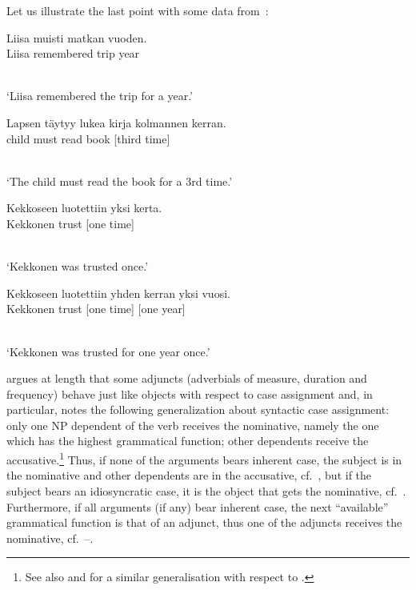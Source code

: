 \documentclass[output=paper]{langsci/langscibook}
\begin{document}
Let us illustrate the last point with some  data from~\citealt{mali:93}:
\begin{examples}
\item \label{subj}
  \begin{gloss}
    Liisa muisti matkan vuoden. \\
    Liisa\Nom{} remembered trip\Acc{} year\Acc{}
  \end{gloss}\\[\glosslen]
  `Liisa remembered the trip for a year.'
\item \label{adv1bis} \label{obj}
  \begin{gloss}
    Lapsen t\"aytyy lukea kirja \phtm{[}kolmannen kerran. \\
    child\Gen{} must read book\Nom{} [third time]\Acc{}
  \end{gloss}\\[\glosslen]
  `The child must read the book for a 3rd time.'
\item \label{adv1}
  \begin{gloss}
    Kekkoseen luotettiin \phtm{[}yksi kerta. \\
    Kekkonen\Ill{} trust\PassP{} [one time]\Nom{}
  \end{gloss}\\[\glosslen]
  `Kekkonen was trusted once.'
\item \label{adv2}
  \begin{gloss}
    Kekkoseen luotettiin \phtm{[}yhden kerran \phtm{[}yksi vuosi. \\
    Kekkonen\Ill{} trust\PassP{} [one time]\Acc{} [one year]\Nom{}
  \end{gloss}\\[\glosslen]
  `Kekkonen was trusted for one year once.'
\end{examples}
\citet{mali:93} argues at length that some adjuncts (adverbials of measure,
duration and frequency) behave just like objects with respect to case
assignment and, in particular, notes the following generalization about
syntactic case assignment: only one NP dependent of the verb receives the
nominative, namely the one which has the highest grammatical function;
other dependents receive the accusative.\footnote{See also
  \citealt{zae:mal:83} and \citealt{ZMT85a} for a similar generalisation with respect to
  .}  Thus, if none of the arguments bears inherent case, the
subject is in the nominative and other dependents are in the accusative, cf.~, but if the subject bears an idiosyncratic case, it is the
object that gets the nominative, cf.~.  Furthermore, if all arguments
(if any) bear inherent case, the next “available” grammatical function is
that of an adjunct, thus one of the adjuncts receives the nominative, 
cf.~–.
\end{document}
